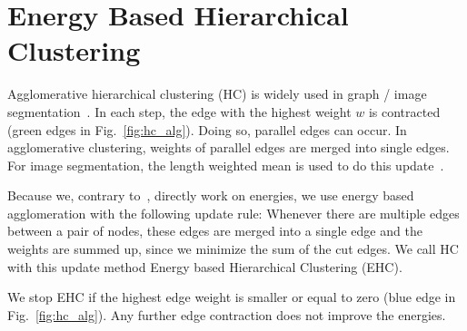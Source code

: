 \documentclass[10pt,twocolumn,letterpaper]{article}
\theoremstyle{definition}
\begin{document}

%
%


\section{Energy Based Hierarchical Clustering}\label{sec:ehc}
Agglomerative hierarchical clustering (HC) is widely used
in graph / image segmentation~\cite{arbelaez_2006}.
In each step, the edge with the highest weight $w$ is
contracted (green edges in Fig.~\ref{fig:hc_alg}).
Doing so, parallel edges can occur.
In agglomerative clustering, weights of
parallel edges are merged into single edges.
For image segmentation, the length
weighted mean is used to do this update~\cite{arbelaez_2006}.

Because we, contrary to~\cite{arbelaez_2006}, directly work on energies, we use energy based agglomeration
with the following update rule:
Whenever there are multiple edges between 
a pair of nodes, these edges are merged into a single edge
and the weights are summed up, since we 
minimize the sum of the cut edges.
We call HC with this update method Energy based Hierarchical Clustering (EHC).

We stop EHC if the highest edge weight is
smaller or equal to zero  (blue edge in Fig.~\ref{fig:hc_alg}). Any further edge
contraction does not improve the energies.




\end{document}
